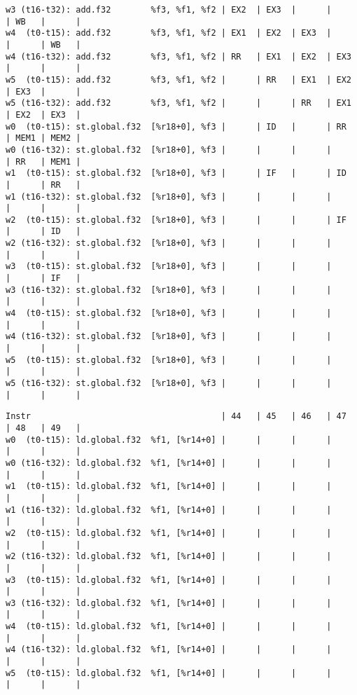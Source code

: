 \documentclass[11pt]{article}
\begin{document}
\begin{Answer}
\begin{verbatim}
w3 (t16-t32): add.f32        %f3, %f1, %f2 | EX2  | EX3  |      |      | WB   |      |
w4  (t0-t15): add.f32        %f3, %f1, %f2 | EX1  | EX2  | EX3  |      |      | WB   |
w4 (t16-t32): add.f32        %f3, %f1, %f2 | RR   | EX1  | EX2  | EX3  |      |      |
w5  (t0-t15): add.f32        %f3, %f1, %f2 |      | RR   | EX1  | EX2  | EX3  |      |
w5 (t16-t32): add.f32        %f3, %f1, %f2 |      |      | RR   | EX1  | EX2  | EX3  |
w0  (t0-t15): st.global.f32  [%r18+0], %f3 |      | ID   |      | RR   | MEM1 | MEM2 |
w0 (t16-t32): st.global.f32  [%r18+0], %f3 |      |      |      |      | RR   | MEM1 |
w1  (t0-t15): st.global.f32  [%r18+0], %f3 |      | IF   |      | ID   |      | RR   |
w1 (t16-t32): st.global.f32  [%r18+0], %f3 |      |      |      |      |      |      |
w2  (t0-t15): st.global.f32  [%r18+0], %f3 |      |      |      | IF   |      | ID   |
w2 (t16-t32): st.global.f32  [%r18+0], %f3 |      |      |      |      |      |      |
w3  (t0-t15): st.global.f32  [%r18+0], %f3 |      |      |      |      |      | IF   |
w3 (t16-t32): st.global.f32  [%r18+0], %f3 |      |      |      |      |      |      |
w4  (t0-t15): st.global.f32  [%r18+0], %f3 |      |      |      |      |      |      |
w4 (t16-t32): st.global.f32  [%r18+0], %f3 |      |      |      |      |      |      |
w5  (t0-t15): st.global.f32  [%r18+0], %f3 |      |      |      |      |      |      |
w5 (t16-t32): st.global.f32  [%r18+0], %f3 |      |      |      |      |      |      |
\end{verbatim}
	\newpage
	\begin{verbatim}
Instr                                      | 44   | 45   | 46   | 47   | 48   | 49   |
w0  (t0-t15): ld.global.f32  %f1, [%r14+0] |      |      |      |      |      |      |
w0 (t16-t32): ld.global.f32  %f1, [%r14+0] |      |      |      |      |      |      |
w1  (t0-t15): ld.global.f32  %f1, [%r14+0] |      |      |      |      |      |      |
w1 (t16-t32): ld.global.f32  %f1, [%r14+0] |      |      |      |      |      |      |
w2  (t0-t15): ld.global.f32  %f1, [%r14+0] |      |      |      |      |      |      |
w2 (t16-t32): ld.global.f32  %f1, [%r14+0] |      |      |      |      |      |      |
w3  (t0-t15): ld.global.f32  %f1, [%r14+0] |      |      |      |      |      |      |
w3 (t16-t32): ld.global.f32  %f1, [%r14+0] |      |      |      |      |      |      |
w4  (t0-t15): ld.global.f32  %f1, [%r14+0] |      |      |      |      |      |      |
w4 (t16-t32): ld.global.f32  %f1, [%r14+0] |      |      |      |      |      |      |
w5  (t0-t15): ld.global.f32  %f1, [%r14+0] |      |      |      |      |      |      |

\end{verbatim}
\end{Answer}
\end{document}
